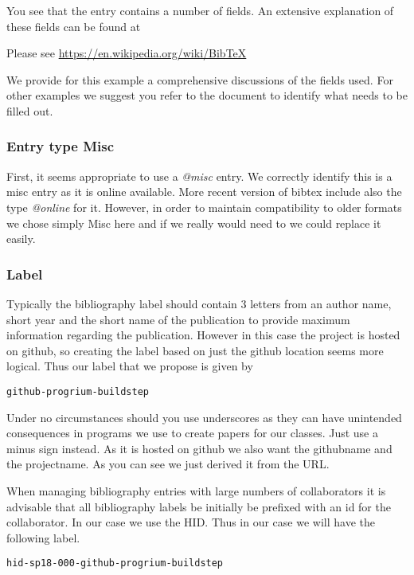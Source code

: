 You see that the entry contains a number of fields. An extensive
explanation of these fields can be found at 

Please see \url{https://en.wikipedia.org/wiki/BibTeX}

We provide for this example a comprehensive discussions of the fields
used. For other examples we suggest you refer to the document to
identify what needs to be filled out.

\subsubsection{Entry type Misc}\label{s:e:entry-type-misc}

First, it seems appropriate to use a \emph{@misc} entry. We correctly
identify this is a misc entry as it is online available. More recent
version of bibtex include also the type \emph{@online} for it. However,
in order to maintain compatibility to older formats we chose simply Misc
here and if we really would need to we could replace it easily.

\subsubsection{Label}\label{s:e:label}

Typically the bibliography label should contain 3 letters from an
author name, short year and the short name of the publication to
provide maximum information regarding the publication. However in this
case the project is hosted on github, so creating the label based on
just the github location seems more logical. Thus our label that we
propose is given by 

\verb|github-progrium-buildstep|


Under no circumstances should you use underscores as they can have unintended
consequences in programs we use to create papers for our classes. Just
use a minus sign instead. As it is hosted on github we also want the
githubname and the projectname. As you can see we just derived it from
the URL.

\begin{IU}
When managing bibliography entries with large numbers of collaborators
it is advisable that all bibliography labels be initially be prefixed
with an id for the collaborator. In our case we use the HID. Thus in
our case we will have the following label.

\verb|hid-sp18-000-github-progrium-buildstep|

\end{IU}


